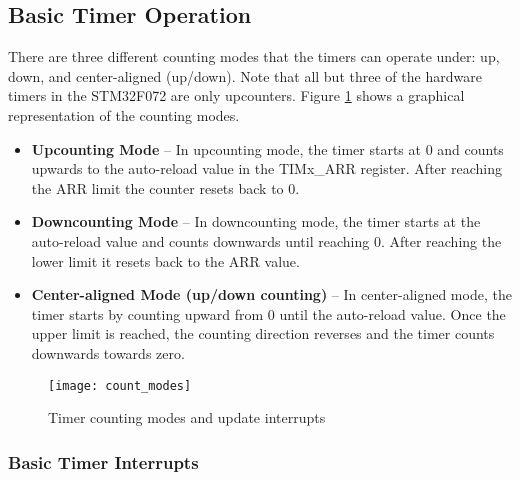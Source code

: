 \documentclass[11pt,fleqn]{book} %
\begin{document}
    \subsection{Basic Timer Operation}
    
    There are three different counting modes that the timers can operate under: up, down, and center-aligned (up/down). Note that all but three of the hardware timers in the STM32F072 are only upcounters. Figure \ref{count_modes} shows a graphical representation of the counting modes. 
    
    \begin{itemize}
        \item \textbf{Upcounting Mode} --  In upcounting mode, the timer starts at 0 and counts upwards to the auto-reload value in the TIMx\_ARR register. After reaching the ARR limit the counter resets back to 0. 
        \item \textbf{Downcounting Mode} -- In downcounting mode, the timer starts at the auto-reload value and counts downwards until reaching 0. After reaching the lower limit it resets back to the ARR value.
        \item \textbf{Center-aligned Mode (up/down counting)} -- In center-aligned mode, the timer starts by counting upward from 0 until the auto-reload value. Once the upper limit is reached, the counting direction reverses and the timer counts downwards towards zero.
    \end{itemize}

    
    
%        
%        
%    
    
    \begin{figure}[]
        \centering\texttt{[image: count\_modes]}
        \caption{Timer counting modes and update interrupts}
        \label{count_modes}
    \end{figure}
    
    \subsubsection{Basic Timer Interrupts}
    
\end{document}
